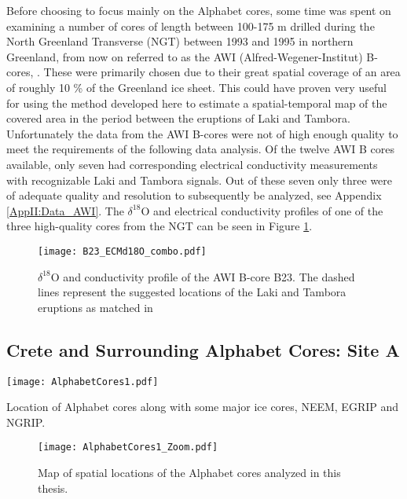 \documentclass[../../CompleteThesis2/Complete_2ndDraft]{subfiles}
\begin{document}
Before choosing to focus mainly on the Alphabet cores, some time was spent on examining a number of cores of length between 100-175 m drilled during the North Greenland Transverse (NGT) between 1993 and 1995 in northern Greenland, from now on referred to as the AWI (Alfred-Wegener-Institut) B-cores, \cite[Weissbach et al. 2016]{Weissbach2016}. These were primarily chosen due to their great spatial coverage of an area of roughly 10 \% of the Greenland ice sheet. This could have proven very useful for using the method developed here to estimate a spatial-temporal map of the covered area in the period between the eruptions of Laki and Tambora. Unfortunately the data from the AWI B-cores were not of high enough quality to meet the requirements of the following data analysis. Of the twelve AWI B cores available, only seven had corresponding electrical conductivity measurements with recognizable Laki and Tambora signals. Out of these seven only three were of adequate quality and resolution to subsequently be analyzed, see Appendix \ref{AppII:Data_AWI}. The $\delta^{18}$O and electrical conductivity profiles of one of the three high-quality cores from the NGT can be seen in Figure \ref{fig:B23_ECMd18O_combo}.

\begin{figure}[h]
	\centering
	\texttt{[image: B23\_ECMd18O\_combo.pdf]}
	\caption[ECM and $\delta^{18}$O data between Laki and Tambora, Site B23]{\small $\delta^{18}$O and conductivity profile of the AWI B-core B23. The dashed lines represent the suggested locations of the Laki and Tambora eruptions as matched in \cite[Weissbach et al. 2016]{Weissbach2016}}
	\label{fig:B23_ECMd18O_combo}
\end{figure}


\subsection[Crete Area][Crete Area]{Crete and Surrounding Alphabet Cores: Site A}
\label{Subsec:Data_Selection_Alhabet}
\begin{marginfigure}
	\centering
	\texttt{[image: AlphabetCores1.pdf]}
	\caption[Map of Greenlandic ice core locations]{\footnotesize Location of Alphabet cores along with some major ice cores, NEEM, EGRIP and NGRIP.}
	\label{Fig:AlphabetCoresMap}
\end{marginfigure}

\begin{figure}[!htb]
	\centering
	\texttt{[image: AlphabetCores1\_Zoom.pdf]}
	\caption[Alphabet Cores Map]{\small Map of spatial locations of the Alphabet cores analyzed in this thesis.}
	\label{Fig:MapAlphabetCores}
\end{figure}
\end{document}
